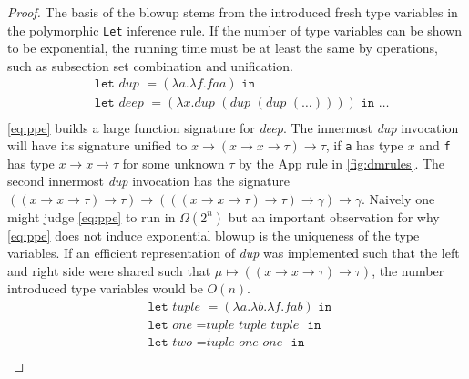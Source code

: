\begin{proof}
    The basis of the blowup stems from the introduced fresh type variables in the polymorphic \texttt{Let} inference rule.
    If the number of type variables can be shown to be exponential, the running time must be at least the same by operations, such as subsection set combination and unification.
    \begin{align}
      &\texttt{let } \textit{dup } = (\lambda a .\lambda f . f a a) \texttt{ in } \label{eq:ppe}\\
      &\texttt{let } \textit{deep } = (\lambda x . \textit{dup } (\textit{dup } (\textit{dup } (\dots)))) \texttt{ in } \dots \tag*{}\\
    \end{align}
    \autoref{eq:ppe} builds a large function signature for \textit{deep}.
    The innermost \textit{dup} invocation will have its signature unified to $x \rightarrow (x \rightarrow x \rightarrow \tau) \rightarrow \tau$, if \texttt{a} has type $x$ and \texttt{f} has type $x \rightarrow x \rightarrow \tau$ for some unknown $\tau$ by the App rule in \autoref{fig:dmrules}.
    The second innermost \textit{dup} invocation has the signature $((x \rightarrow x \rightarrow \tau) \rightarrow \tau) \rightarrow (((x \rightarrow x \rightarrow \tau) \rightarrow \tau) \rightarrow \gamma) \rightarrow \gamma$.
    Naively one might judge \autoref{eq:ppe} to run in $\Omega(2^n)$ but an important observation for why \autoref{eq:ppe} does not induce exponential blowup is the uniqueness of the type variables.
    If an efficient representation of \textit{dup} was implemented such that the left and right side were shared such that $\mu \mapsto ((x \rightarrow x \rightarrow \tau) \rightarrow \tau)$, the number introduced type variables would be $O(n)$.
    \begin{align}
      &\texttt{let } \textit{tuple } = (\lambda a . \lambda b . \lambda f . f a b) \texttt{ in } \label{eq:ppexp}\\
      &\texttt{let } \textit{one } = \textit{tuple } \textit{tuple } \textit{tuple } \texttt{ in } \tag*{}\\
      &\texttt{let } \textit{two } = \textit{tuple } \textit{one } \textit{one } \texttt{ in } \tag*{}\\

\end{align}
\end{proof}
